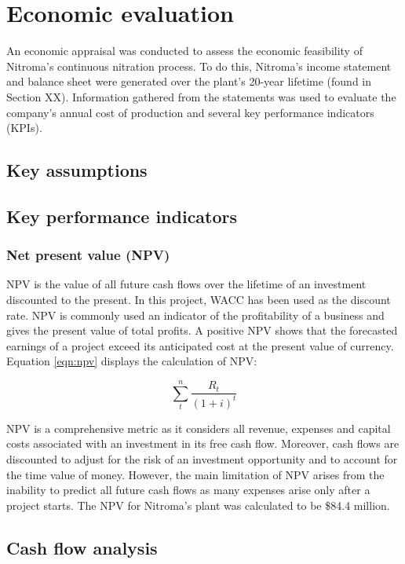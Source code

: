 \section{Economic evaluation}
An economic appraisal was conducted to assess the economic feasibility of Nitroma’s continuous nitration process. To do this, Nitroma’s income statement and balance sheet were generated over the plant’s 20-year lifetime (found in Section XX). Information gathered from the statements was used to evaluate the company’s annual cost of production and several key performance indicators (KPIs).

\subsection{Key assumptions}

\subsection{Key performance indicators}

\subsubsection{Net present value (NPV)}
NPV is the value of all future cash flows over the lifetime of an investment discounted to the present. In this project, WACC has been used as the discount rate. NPV is commonly used an indicator of the profitability of a business and gives the present value of total profits. A positive NPV shows that the forecasted earnings of a project exceed its anticipated cost at the present value of currency. Equation \ref{eqn:npv} displays the calculation of NPV:

\begin{equation}
\label{eqn:npv}
    \sum_t^n\frac{R_{t}}{(1+i)^{t}}
\end{equation}

NPV is a comprehensive metric as it considers all revenue, expenses and capital costs associated with an investment in its free cash flow. Moreover, cash flows are discounted to adjust for the risk of an investment opportunity and to account for the time value of money. However, the main limitation of NPV arises from the inability to predict all future cash flows as many expenses arise only after a project starts. The NPV for Nitroma’s plant was calculated to be \$84.4 million.

\subsection{Cash flow analysis}
